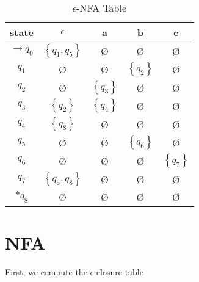 \documentclass[12pt]{article}
\begin{document}
\begin{table}[H]
  \centering

  \begin{tabular}{c|cccc}
    state             & $\epsilon$               & a                    & b                    & c                    \\ \hline
    $\rightarrow q_0$ & $\left\{q_1,q_5\right\}$ & \O                   & \O                   & \O                   \\
    $q_1$             & \O                       & \O                   & $\left\{q_2\right\}$ & \O                   \\
    $q_2$             & \O                       & $\left\{q_3\right\}$ & \O                   & \O                   \\
    $q_3$             & $\left\{q_2\right\}$     & $\left\{q_4\right\}$ & \O                   & \O                   \\
    $q_4$             & $\left\{q_8\right\}$     & \O                   & \O                   & \O                   \\
    $q_5$             & \O                       & \O                   & $\left\{q_6\right\}$ & \O                   \\
    $q_6$             & \O                       & \O                   & \O                   & $\left\{q_7\right\}$ \\
    $q_7$             & $\left\{q_5,q_8\right\}$ & \O                   & \O                   & \O                   \\
    $* q_8$           & \O                       & \O                   & \O                   & \O
  \end{tabular}

  \caption{$\epsilon$-NFA Table}
\end{table}

\section{NFA}

First, we compute the $\epsilon$-closure table
\end{document}
